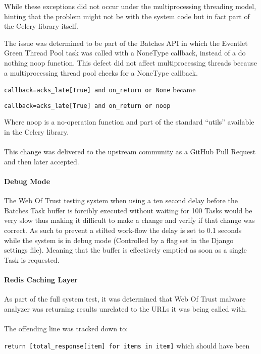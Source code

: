 While these exceptions did not occur under the multiprocessing threading model, hinting that the problem might not be with the system code but in fact part of the Celery library itself.

The issue was determined to be part of the Batches API in which the Eventlet Green Thread Pool task was called with a NoneType callback, instead of a do nothing noop function.  This defect did not affect multiprocessing threads because a multiprocessing thread pool checks for a NoneType callback.

\verb`callback=acks_late[True] and on_return or None` became

\verb`callback=acks_late[True] and on_return or noop`

Where noop is a no-operation function and part of the standard ``utils'' available in the Celery library.

\paragraph{}
This change was delivered to the upstream community as a GitHub Pull Request and then later accepted\cite{celery-batches-fix}.

\paragraph{Debug Mode}
The Web Of Trust testing system when using a ten second delay before the Batches Task buffer is forcibly executed without waiting for 100 Tasks would be very slow thus making it difficult to make a change and verify if that change was correct. As such to prevent a stilted work-flow the delay is set to 0.1 seconds while the system is in debug mode (Controlled by a flag set in the Django settings file).  Meaning that the buffer is effectively emptied as soon as a single Task is requested.
\paragraph{Redis Caching Layer}
As part of the full system test, it was determined that Web Of Trust malware analyzer was returning results unrelated to the URLs it was being called with.

\paragraph{}
The offending line was tracked down to:

\verb`return [total_response[item] for items in item]` which should have been

